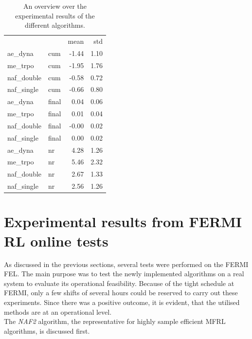 \documentclass[
reprint,
amsmath,amssymb,amsfonts,clevref,
aps,
prstab,
]{revtex4-2}
\begin{document}
\begin{table}[b]%
	\caption{\label{tab:overview_algorithms_results}%
		An overview over the experimental results of the different algorithms.
	}
\begin{ruledtabular}
\begin{tabular}{llrr}
&    &  mean &   std \\
ae\_dyna & cum & -1.44 &  1.10 \\
me\_trpo & cum & -1.95 &  1.76 \\
naf\_double & cum & -0.58 &  0.72 \\
naf\_single & cum & -0.66 &  0.80 \\
ae\_dyna & final &  0.04 &  0.06 \\
me\_trpo & final &  0.01 &  0.04 \\
naf\_double & final & -0.00 &  0.02 \\
naf\_single & final &  0.00 &  0.02 \\
ae\_dyna & nr &  4.28 &  1.26 \\
me\_trpo & nr &  5.46 &  2.32 \\
naf\_double & nr &  2.67 &  1.33 \\
naf\_single & nr &  2.56 &  1.26 \\
\end{tabular}
\end{ruledtabular}
\end{table}

	\section{Experimental results from FERMI RL online tests}\label{sec:Experimental results from FERMI RL online tests}
	As discussed in the previous sections, several tests were performed on the FERMI FEL.
	The main purpose was to test the newly implemented algorithms on a real system to evaluate its operational feasibility. 
	Because of the tight schedule at FERMI, only a few shifts of several hours could be reserved to carry out these experiments. Since there was a positive outcome, it is evident, that the utilised methods are at an operational level.\\
	The \emph{NAF2} algorithm, the representative for highly sample efficient MFRL algorithms, is discussed first.
\end{document}
